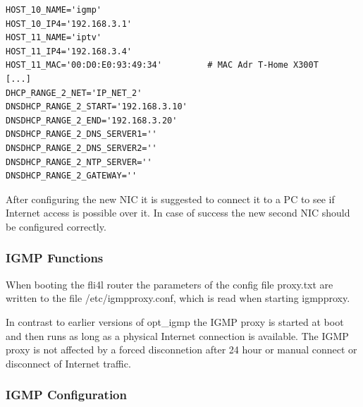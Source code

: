 \begin{example}
\begin{verbatim}
HOST_10_NAME='igmp'
HOST_10_IP4='192.168.3.1'
HOST_11_NAME='iptv'
HOST_11_IP4='192.168.3.4'
HOST_11_MAC='00:D0:E0:93:49:34'         # MAC Adr T-Home X300T
[...]
DHCP_RANGE_2_NET='IP_NET_2'
DNSDHCP_RANGE_2_START='192.168.3.10'
DNSDHCP_RANGE_2_END='192.168.3.20'
DNSDHCP_RANGE_2_DNS_SERVER1=''
DNSDHCP_RANGE_2_DNS_SERVER2=''
DNSDHCP_RANGE_2_NTP_SERVER=''
DNSDHCP_RANGE_2_GATEWAY=''
\end{verbatim}
\end{example}

After configuring the new NIC it is suggested to connect it to a PC to see if
Internet access is possible over it. In case of success the new second
NIC should be configured correctly.

\subsubsection{IGMP Functions}

When booting the fli4l router the parameters of the config file proxy.txt
are written to the file /etc/igmpproxy.conf, which is read when starting
igmpproxy.

In contrast to earlier versions of opt\_igmp the IGMP proxy is started at
boot and then runs as long as a physical Internet connection is available.
The IGMP proxy is not affected by a forced disconnetion after 24 hour or
manual connect or disconnect of Internet traffic.

\subsubsection{IGMP Configuration}

